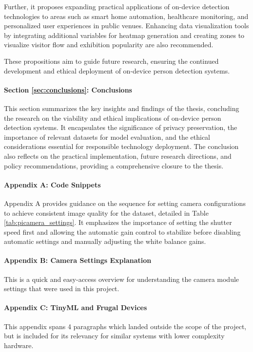 Further, it proposes expanding practical applications of on-device detection technologies to areas such as smart home automation, healthcare monitoring, and personalized user experiences in public venues. Enhancing data visualization tools by integrating additional variables for heatmap generation and creating zones to visualize visitor flow and exhibition popularity are also recommended.

These propositions aim to guide future research, ensuring the continued development and ethical deployment of on-device person detection systems.

\paragraph{Section \ref{sec:conclusions}: Conclusions} 
This section summarizes the key insights and findings of the thesis, concluding the research on the viability and ethical implications of on-device person detection systems. It encapsulates the significance of privacy preservation, the importance of relevant datasets for model evaluation, and the ethical considerations essential for responsible technology deployment. The conclusion also reflects on the practical implementation, future research directions, and policy recommendations, providing a comprehensive closure to the thesis.

\paragraph{Appendix A: Code Snippets} Appendix A provides guidance on the sequence for setting camera configurations to achieve consistent image quality for the dataset, detailed in Table \ref{tab:picamera_settings}. It emphasizes the importance of setting the shutter speed first and allowing the automatic gain control to stabilize before disabling automatic settings and manually adjusting the white balance gains.

\paragraph{Appendix B: Camera Settings Explanation} This is a quick and easy-access overview for understanding the camera module settings that were used in this project. 

\paragraph{Appendix C: TinyML and Frugal Devices} This appendix spans 4 paragraphs which landed outside the scope of the project, but is included for its relevancy for similar systems with lower complexity hardware. 

